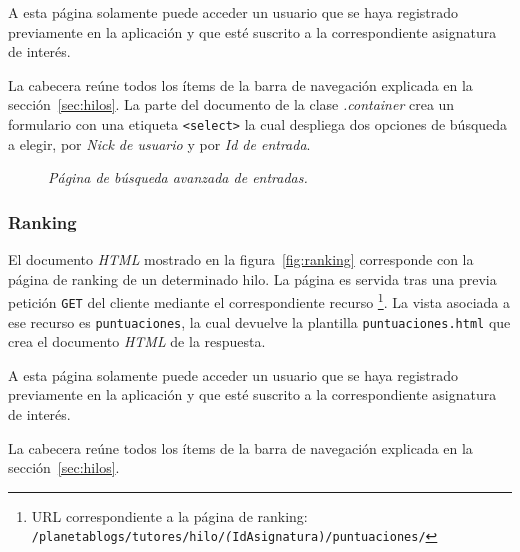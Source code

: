 \documentclass[a4paper, 12pt]{book}
\begin{document}
A esta p\'agina solamente puede acceder un usuario que se haya registrado previamente en la aplicaci\'on y que est\'e suscrito a la correspondiente 
asignatura de inter\'es.

La cabecera re\'une todos los \'items de la barra de navegaci\'on explicada en la secci\'on~\ref{sec:hilos}. La parte del documento de la clase 
\textit{.container} crea un formulario con una etiqueta \texttt{<select>} la cual despliega dos opciones de b\'usqueda a elegir, por \textit{Nick de usuario} 
y por \textit{Id de entrada}.
\begin{figure}
  \centering
  \caption{\textit{P\'agina de b\'usqueda avanzada de entradas.}}
  \label{fig:buscar}
\end{figure}


\subsubsection{Ranking} 
\label{sec:ranking}
El documento \textit{HTML} mostrado en la figura~\ref{fig:ranking} corresponde con la p\'agina de ranking de un determinado hilo. 
La p\'agina es servida tras una previa petici\'on \texttt{GET} del cliente mediante el correspondiente recurso \footnote{URL correspondiente a la p\'agina de 
ranking: \texttt{/planetablogs/tutores/hilo/\textit(IdAsignatura)/puntuaciones/}}. La vista asociada a ese recurso es \texttt{puntuaciones}, la cual 
devuelve la plantilla \texttt{puntuaciones.html} que crea el documento \textit{HTML} de la respuesta.

A esta p\'agina solamente puede acceder un usuario que se haya registrado previamente en la aplicaci\'on y que est\'e suscrito a la
correspondiente asignatura de inter\'es.

La cabecera re\'une todos los \'items de la barra de navegaci\'on explicada en la secci\'on~\ref{sec:hilos}. 
\end{document}
